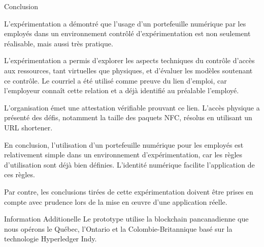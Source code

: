 \documentclass[final]{beamer}
\newlength{\onecolwid}
\begin{document}
\begin{frame}[t]
\begin{columns}[t]
\begin{column}{\onecolwid}



\begin{block}{Conclusion}

L'expérimentation a démontré que l'usage d'un portefeuille numérique par les employés dans un environnement contrôlé d'expérimentation est non seulement réalisable, mais aussi très pratique. 

L'expérimentation a permis d'explorer les aspects techniques du contrôle d'accès aux ressources, tant virtuelles que physiques, et d'évaluer les modèles soutenant ce contrôle. Le courriel a été utilisé comme preuve du lien d'emploi, car l'employeur connaît cette relation et a déjà identifié au préalable l'employé. 

L'organisation émet une attestation vérifiable prouvant ce lien. L'accès physique a présenté des défis, notamment la taille des paquets NFC, résolus en utilisant un URL shortener. 

En conclusion, l'utilisation d'un portefeuille numérique pour les employés est relativement simple dans un environnement d'expérimentation, car les règles d'utilisation sont déjà bien définies. L'identité numérique facilite l'application de ces règles.

Par contre, les conclusions tirées de cette expérimentation doivent être prises en compte avec prudence lors de la mise en œuvre d'une application réelle. 

\end{block}


\begin{block}{Information Additionelle}
Le prototype utilise la blockchain pancanadienne que nous opérons le Québec, l’Ontario et la Colombie-Britannique basé sur la technologie Hyperledger Indy.


\end{block}
\end{column}
\end{columns}
\end{frame}
\end{document}
